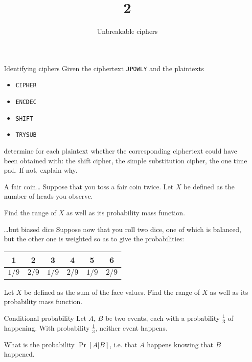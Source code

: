 \documentclass{practice}
\title{2}
\subtitle{Unbreakable ciphers}
\date{\DTMdate{2024-09-18}}
\begin{document}
\maketitle

\begin{task}{Identifying ciphers}
  Given the ciphertext \texttt{JPOWLY} and the plaintexts
  \begin{itemize}
    \item \texttt{CIPHER}
    \item \texttt{ENCDEC}
    \item \texttt{SHIFT}
    \item \texttt{TRYSUB}
  \end{itemize}
  determine for each plaintext whether the corresponding ciphertext could have been obtained with: the shift cipher, the simple substitution cipher, the one time pad.
  If not, explain why.
\end{task}

\begin{task}{A fair coin\dots}
  Suppose that you toss a fair coin twice.
  Let $X$ be defined as the number of heads you observe.

  Find the range of $X$ as well as its probability mass function.
\end{task}

\begin{task}{\dots{}but biased dice}
  Suppose now that you roll two dice, one of which is balanced, but the other one is weighted
  so as to give the probabilities:
  \begin{table}[h!]
    \centering
    \begin{tabular}{@{}cccccc@{}}
      1 & 2 & 3 & 4 & 5 & 6\\\midrule
      $1/9$ & $2/9$ & $1/9$ & $2/9$ & $1/9$ & $2/9$
    \end{tabular}
  \end{table}
  \vspace{-0.7em}

  Let $X$ be defined as the sum of the face values.
  Find the range of $X$ as well as its probability mass function.
\end{task}

\begin{task}{Conditional probability}
  Let $A$, $B$ be two events, each with a probability $\frac{1}{3}$ of happening.
  With probability $\frac{1}{3}$, neither event happens.

  What is the probability $\Pr[A\vert B]$, i.e. that $A$ happens knowing that $B$ happened.
\end{task}
\end{document}
